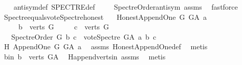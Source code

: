 \begin{isabellebody}
\ \ %
\endisadelimproof
%
\isatagproof
{}\isamarkupfalse%
\ antisym{\isacharunderscore}{\kern0pt}def\ SPECTRE{\isacharunderscore}{\kern0pt}def\ \isanewline
\ \ \isamarkupfalse%
\ Spectre{\isacharunderscore}{\kern0pt}Order{\isacharunderscore}{\kern0pt}antisym\ assms\ \isamarkupfalse%
\ fastforce%
\endisatagproof
{\isafoldproof}%
%
\isadelimproof
\isanewline
%
\endisadelimproof
\isanewline
\isanewline
{}\isamarkupfalse%
\ Spectre{\isacharunderscore}{\kern0pt}equals{\isacharunderscore}{\kern0pt}vote{\isacharunderscore}{\kern0pt}Spectre{\isacharunderscore}{\kern0pt}honest{\isacharcolon}{\kern0pt}\isanewline
\ \ \ {\isachardoublequoteopen}Honest{\isacharunderscore}{\kern0pt}Append{\isacharunderscore}{\kern0pt}One\ G\ G{\isacharunderscore}{\kern0pt}A\ a{\isachardoublequoteclose}\isanewline
\ \ \ \ \ {\isachardoublequoteopen}b\ {\isasymin}\ verts\ G{\isachardoublequoteclose}\isanewline
\ \ \ \ \ {\isachardoublequoteopen}c\ {\isasymin}\ verts\ G{\isachardoublequoteclose}\isanewline
\ \ \ {\isachardoublequoteopen}Spectre{\isacharunderscore}{\kern0pt}Order\ G\ b\ c\ {\isasymlongleftrightarrow}\ vote{\isacharunderscore}{\kern0pt}Spectre\ G{\isacharunderscore}{\kern0pt}A\ a\ b\ c\ {\isacharequal}{\kern0pt}\ {}{\isachardoublequoteclose}\isanewline
%
\isadelimproof
%
\endisadelimproof
%
\isatagproof
{}\isamarkupfalse%
\ {\isacharminus}{\kern0pt}\isanewline
\ \ \isamarkupfalse%
\ H{\isacharcolon}{\kern0pt}\ Append{\isacharunderscore}{\kern0pt}One\ {\isachardoublequoteopen}G{\isachardoublequoteclose}\ {\isachardoublequoteopen}G{\isacharunderscore}{\kern0pt}A{\isachardoublequoteclose}\ {\isachardoublequoteopen}a{\isachardoublequoteclose}\ \isamarkupfalse%
\ assms{\isacharparenleft}{\kern0pt}{}{\isacharparenright}{\kern0pt}\ Honest{\isacharunderscore}{\kern0pt}Append{\isacharunderscore}{\kern0pt}One{\isacharunderscore}{\kern0pt}def\ \isamarkupfalse%
\ metis\isanewline
\ \ \isamarkupfalse%
\ b{\isacharunderscore}{\kern0pt}in{\isacharcolon}{\kern0pt}\ {\isachardoublequoteopen}b\ {\isasymin}\ verts\ G{\isacharunderscore}{\kern0pt}A{\isachardoublequoteclose}\ \isamarkupfalse%
\ H{\isachardot}{\kern0pt}append{\isacharunderscore}{\kern0pt}verts{\isacharunderscore}{\kern0pt}in\ assms{\isacharparenleft}{\kern0pt}{}{\isacharparenright}{\kern0pt}\ \isamarkupfalse%
\ metis\isanewline
\ \ \isamarkupfalse%

\end{isabellebody}
